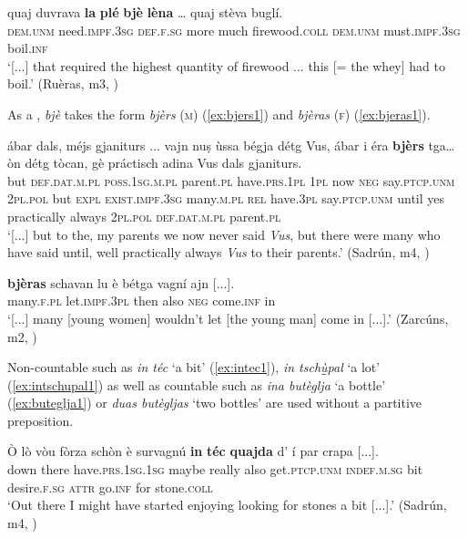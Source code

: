 \ea
\label{ex:laplebje}
\gll [...] quaj duvrava \textbf{la} \textbf{plé} \textbf{bjè} \textbf{lèna} … quaj stèva buglí.  \\
{} \textsc{dem.unm} need.\textsc{impf.3sg} \textsc{def.f.sg} more much firewood.\textsc{coll} {} \textsc{dem.unm} must.\textsc{impf.3sg} boil.\textsc{inf}\\
\glt `[...] that required the highest quantity of firewood ... this [= the whey] had to boil.' (Ruèras, m3, )
\z

As a , \textit{bjè} takes the form \textit{bjèrs} (\textsc{m}) (\ref{ex:bjers1}) and \textit{bjèras} (\textsc{f}) (\ref{ex:bjeras1}).

\ea
\label{ex:bjers1}
\gll  [...] ábar dals, méjs gjaniturs ... vajn nuṣ ùssa bégja détg Vus, ábar i éra \textbf{bjèrs} tga… òn détg tòcan, gè práctisch adina Vus dals gjaniturs.  \\
{} but \textsc{def.dat.m.pl} \textsc{poss.1sg.m.pl} parent.\textsc{pl} {} have.\textsc{prs.1pl} \textsc{1pl} now \textsc{neg} say.\textsc{ptcp.unm} \textsc{2pl.pol} but \textsc{expl} \textsc{exist.impf.3sg}  many.\textsc{m.pl} \textsc{rel} have.\textsc{3pl} say.\textsc{ptcp.unm} until yes practically always \textsc{2pl.pol} \textsc{def.dat.m.pl} parent.\textsc{pl}\\
\glt `[...] but to the, my parents we now never said \textit{Vus}, but there were many who have said until, well practically always \textit{Vus} to their parents.' (Sadrún, m4, )
\z

\ea
\label{ex:bjeras1}
\gll    [...] \textbf{bjèras} schavan lu è bétga vagní ajn [...].\\
{} many.\textsc{f.pl} let.\textsc{impf.3pl} then also \textsc{neg} come.\textsc{inf} in\\
\glt `[...] many [young women] wouldn’t let [the young man] come in [...].' (Zarcúns, m2, )
\z

Non-countable  such as \textit{in téc} `a bit' (\ref{ex:intec1}), \textit{in tsch{\`u̱̱}pal} `a lot' (\ref{ex:intschupal1}) as well as countable  such as \textit{ina butèglja} `a bottle' (\ref{ex:buteglja1}) or \textit{duas butègljas} `two bottles' are used without a partitive preposition.

\ea
\label{ex:intec1}
\gll  Ò lò vòu fòrza schòn è survagnú \textbf{in} \textbf{téc} \textbf{quajda} d' í par crapa [...].\\
down there  have.\textsc{prs.1sg.1sg} maybe really also get.\textsc{ptcp.unm} \textsc{indef.m.sg} bit desire.\textsc{f.sg} \textsc{attr} go.\textsc{inf} for stone.\textsc{coll} \\
\glt `Out there I might have started enjoying looking for stones a bit [...].' (Sadrún, m4, )
\z

